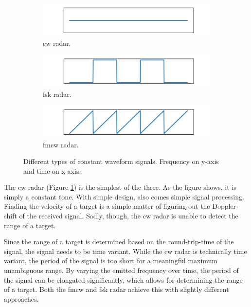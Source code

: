 \begin{figure}[H]
    \centering
    \begin{subfigure}[b]{\textwidth}
        \centering
        \includegraphics[width=\textwidth]{fig/2/cw_wave.png}
        \caption{\gls{cw} radar.}
        \label{fig:cw}
    \end{subfigure}

    \begin{subfigure}[b]{\textwidth}
        \centering
        \includegraphics[width=\textwidth]{fig/2/fsk_wave.png}
        \caption{\gls{fsk} radar.}
        \label{fig:fsk}
    \end{subfigure}

    \begin{subfigure}[b]{\textwidth}
        \centering
        \includegraphics[width=\textwidth]{fig/2/fmcw_wave.png}
        \caption{\gls{fmcw} radar.}
        \label{fig:fmcw}
    \end{subfigure}

    \caption{Different types of constant waveform signals.
                Frequency on y-axis and time on x-axis.}
    \label{fig:cw_waveforms}
\end{figure}

The \gls{cw} radar (Figure \ref{fig:cw}) is the simplest of the three.
As the figure shows, it is simply a constant tone.
With simple design, also comes simple signal processing.
Finding the velocity of a target is a simple matter of figuring out the Doppler-shift
of the received signal.
Sadly, though, the \gls{cw} radar is unable to detect the range of a target.

Since the range of a target is determined based on the round-trip-time of the signal,
the signal needs to be time variant.
While the \gls{cw} radar is technically time variant,
the period of the signal is too short for a meaningful maximum unambiguous range.
By varying the emitted frequency over time,
the period of the signal can be elongated significantly,
which allows for determining the range of a target.
Both the \gls{fmcw} and \gls{fsk} radar achieve this with slightly different approaches.

